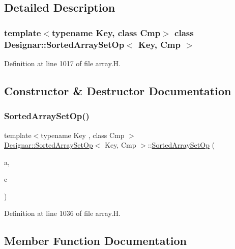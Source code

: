 \subsection{Detailed Description}
\subsubsection*{template$<$typename Key, class Cmp$>$\newline
class Designar\+::\+Sorted\+Array\+Set\+Op$<$ Key, Cmp $>$}



Definition at line 1017 of file array.\+H.



\subsection{Constructor \& Destructor Documentation}
\mbox{\label{class_designar_1_1_sorted_array_set_op_a2d732318892f21ead8d988b5a76a016b}} 
\subsubsection{\texorpdfstring{Sorted\+Array\+Set\+Op()}{SortedArraySetOp()}}
{\footnotesize\ttfamily template$<$typename Key , class Cmp $>$ \\
\hyperlink{class_designar_1_1_sorted_array_set_op}{Designar\+::\+Sorted\+Array\+Set\+Op}$<$ Key, Cmp $>$\+::\hyperlink{class_designar_1_1_sorted_array_set_op}{Sorted\+Array\+Set\+Op} (\begin{DoxyParamCaption}\item[{\hyperlink{class_designar_1_1_dyn_array}{Dyn\+Array}$<$ Key $>$ \&}]{a,  }\item[{Cmp \&}]{c }\end{DoxyParamCaption})\hspace{0.3cm}{\ttfamily [inline]}}



Definition at line 1036 of file array.\+H.



\subsection{Member Function Documentation}
\mbox{\label{class_designar_1_1_sorted_array_set_op_adef257a4a2debcef385f570b1cd72037}} 
